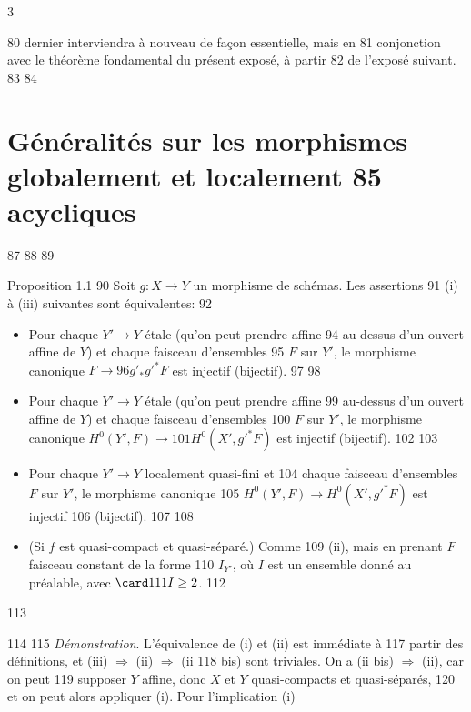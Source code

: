 3	\documentclass[10pt]{../fichiers-configuration-latex/smfart}
\begin{document}
    80	dernier interviendra à nouveau de façon essentielle, mais en
    81	conjonction avec le théorème fondamental du présent exposé, à partir
    82	de l'exposé suivant.
    83	
    84	\section{Généralités sur les morphismes globalement et localement
    85	  acycliques}	
    87	%
    88	
    89	\begin{enonce*}{Proposition 1.1}
    90	Soit $g:X\rightarrow Y$ un morphisme de schémas. Les assertions
    91	{\rm(i)} à {\rm(iii)} suivantes sont équivalentes:
    92	\begin{itemize}
    93	\item[(i)] Pour chaque $Y'\rightarrow Y$ étale (qu'on peut prendre affine
    94	  au-dessus d'un ouvert affine de $Y$) et chaque faisceau d'ensembles
    95	  $F$ sur $Y'$, le morphisme canonique $F\rightarrow
    96	  g'_{\ast}{g'}^{\ast}F$ est injectif (\resp bijectif).
    97	
    98	\item[(ii)] Pour chaque $Y'\rightarrow Y$ étale (qu'on peut prendre affine
    99	  au-dessus d'un ouvert affine de $Y$) et chaque faisceau d'ensembles
   100	  $F$ sur $Y'$, le morphisme canonique $H^{0}(Y',F)\rightarrow
   101	  H^{0}(X',{g'}^{\ast}F)$ est injectif (\resp bijectif).
   102	
   103	\item[(iii)] Pour chaque $Y'\rightarrow Y$ localement quasi-fini et
   104	  chaque faisceau d'ensembles $F$ sur $Y'$, le morphisme canonique
   105	  $H^{0}(Y',F)\rightarrow H^{0}(X',{g'}^{\ast}F)$ est injectif
   106	  (\resp bijectif).
   107	
   108	\item[(ii bis)] (Si $f$ est quasi-compact et quasi-séparé.) Comme
   109	  {\rm(ii)}, mais en prenant $F$ faisceau constant de la forme
   110	  $I_{Y'}$, où $I$ est un ensemble donné au préalable, avec $\card
   111	  I\geq 2$.
   112	\end{itemize}
   113	\end{enonce*}
   114	
   115		\emph{Démonstration}. L'équivalence de (i) et (ii) est immédiate à
   117	partir des définitions, et (iii) $\Rightarrow$ (ii) $\Rightarrow$ (ii
   118	bis) sont triviales. On a (ii bis) $\Rightarrow$ (ii), car on peut
   119	supposer $Y$ affine, donc $X$ et $Y$ quasi-compacts et quasi-séparés,
   120	et on peut alors appliquer  (i). Pour l'implication (i)
\end{document}
